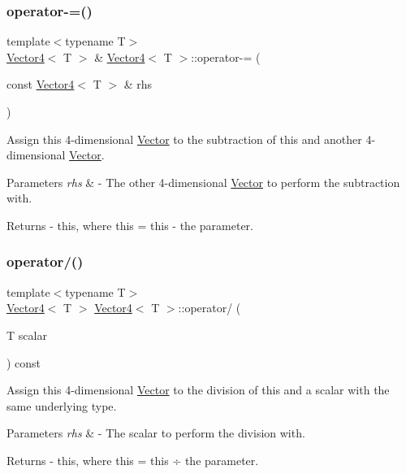 \subsubsection{\texorpdfstring{operator-\/=()}{operator-=()}}
{\footnotesize\ttfamily template$<$typename T$>$ \\
\mbox{\hyperlink{class_vector4}{Vector4}}$<$ T $>$ \& \mbox{\hyperlink{class_vector4}{Vector4}}$<$ T $>$\+::operator-\/= (\begin{DoxyParamCaption}\item[{const \mbox{\hyperlink{class_vector4}{Vector4}}$<$ T $>$ \&}]{rhs }\end{DoxyParamCaption})}

Assign this 4-\/dimensional \mbox{\hyperlink{class_vector}{Vector}} to the subtraction of this and another 4-\/dimensional \mbox{\hyperlink{class_vector}{Vector}}. 
\begin{DoxyParams}{Parameters}
{\em rhs} & -\/ The other 4-\/dimensional \mbox{\hyperlink{class_vector}{Vector}} to perform the subtraction with. \\
\hline
\end{DoxyParams}
\begin{DoxyReturn}{Returns}
-\/ this, where \textquotesingle{}this = this -\/ the parameter\textquotesingle{}. 
\end{DoxyReturn}
\mbox{\label{class_vector4_a0d7e9b8d9b2d7033d49271105945db94}} 
\subsubsection{\texorpdfstring{operator/()}{operator/()}}
{\footnotesize\ttfamily template$<$typename T$>$ \\
\mbox{\hyperlink{class_vector4}{Vector4}}$<$ T $>$ \mbox{\hyperlink{class_vector4}{Vector4}}$<$ T $>$\+::operator/ (\begin{DoxyParamCaption}\item[{T}]{scalar }\end{DoxyParamCaption}) const}

Assign this 4-\/dimensional \mbox{\hyperlink{class_vector}{Vector}} to the division of this and a scalar with the same underlying type. 
\begin{DoxyParams}{Parameters}
{\em rhs} & -\/ The scalar to perform the division with. \\
\hline
\end{DoxyParams}
\begin{DoxyReturn}{Returns}
-\/ this, where \textquotesingle{}this = this ÷ the parameter\textquotesingle{}. 
\end{DoxyReturn}
\mbox{\label{class_vector4_a566b4c05fada0fe8823c56f6d407fb25}} 
